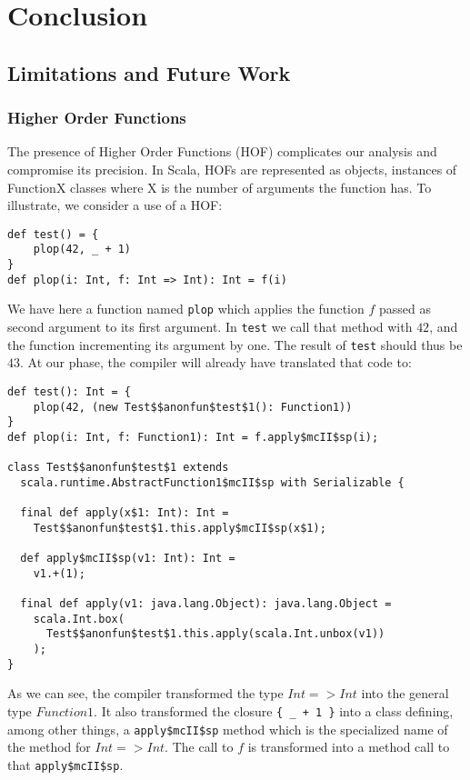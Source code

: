\chapter{Conclusion}
\label{chap:conclusion}

\section{Limitations and Future Work}

\subsection{Higher Order Functions}
The presence of Higher Order Functions (HOF) complicates our analysis and
compromise its precision. In Scala, HOFs are represented as objects, instances
of FunctionX classes where X is the number of arguments the function has. To
illustrate, we consider a use of a HOF:
\begin{lstlisting}
def test() = {
    plop(42, _ + 1)
}
def plop(i: Int, f: Int => Int): Int = f(i)
\end{lstlisting}
We have here a function named \verb/plop/ which applies the function $f$ passed
as second argument to its first argument. In \verb/test/ we call that method
with $42$, and the function incrementing its argument by one. The result of
\verb/test/ should thus be $43$. At our phase, the compiler will already have
translated that code to:
\begin{lstlisting}
def test(): Int = {
    plop(42, (new Test$$anonfun$test$1(): Function1))
}
def plop(i: Int, f: Function1): Int = f.apply$mcII$sp(i);

class Test$$anonfun$test$1 extends
  scala.runtime.AbstractFunction1$mcII$sp with Serializable {

  final def apply(x$1: Int): Int =
    Test$$anonfun$test$1.this.apply$mcII$sp(x$1);

  def apply$mcII$sp(v1: Int): Int =
    v1.+(1);

  final def apply(v1: java.lang.Object): java.lang.Object =
    scala.Int.box(
      Test$$anonfun$test$1.this.apply(scala.Int.unbox(v1))
    );
}

\end{lstlisting}
As we can see, the compiler transformed the type $Int => Int$ into the general
type $Function1$. It also transformed the closure \verb/{ _ + 1 }/ into a class
defining, among other things, a \verb/apply$mcII$sp/ method which is the
specialized name of the method for $Int => Int$. The call to $f$ is transformed
into a method call to that \verb/apply$mcII$sp/.

